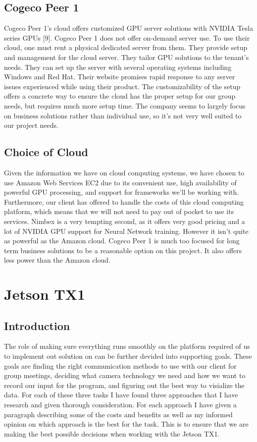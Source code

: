 \documentclass{scrreprt}
\begin{document}
\subsection{Cogeco Peer 1}
Cogeco Peer 1’s cloud offers customized GPU server solutions with NVIDIA Tesla series GPUs [9]. 
Cogeco Peer 1 does not offer on-demand server use. 
To use their cloud, one must rent a physical dedicated server from them. 
They provide setup and management for the cloud server.
They tailor GPU solutions to the tenant’s needs. 
They can set up the server with several operating systems including Windows and Red Hat. 
Their website promises rapid response to any server issues experienced while using their product. 
The customizability of the setup offers a concrete way to ensure the cloud has the proper setup for our group needs, but requires much more setup time. 
The company seems to largely focus on business solutions rather than individual use, so it’s not very well suited to our project needs.

\subsection{Choice of Cloud}
Given the information we have on cloud computing systems, we have chosen to use Amazon Web Services EC2 due to its convenient use, high availability of powerful GPU processing, and support for frameworks we’ll be working with. 
Furthermore, our client has offered to handle the costs of this cloud computing platform, which means that we will not need to pay out of pocket to use its services. 
Nimbex is a very tempting second, as it offers very good pricing and a lot of NVIDIA GPU support for Neural Network training. However it isn’t quite as powerful as the Amazon cloud. 
Cogeco Peer 1 is much too focused for long term business solutions to be a reasonable option on this project. 
It also offers less power than the Amazon cloud.

\section{Jetson TX1}
\subsection{Introduction}
The role of making sure everything runs smoothly on the platform required of us to implement out solution on can be further devided into supporting goals.
These goals are finding the right communication methods to use with our client for group meetings, deciding what camera technology we need and how we want to record our input for the program, and figuring out the best way to visialize the data.
For each of these three tasks I have found three approaches that I have research and given thorough consideration.
For each approach I have given a paragraph describing some of the costs and benefits as well as my informed opinion on which approach is the best for the task.
This is to ensure that we are making the best possible decisions when working with the Jetson TX1.
\end{document}
